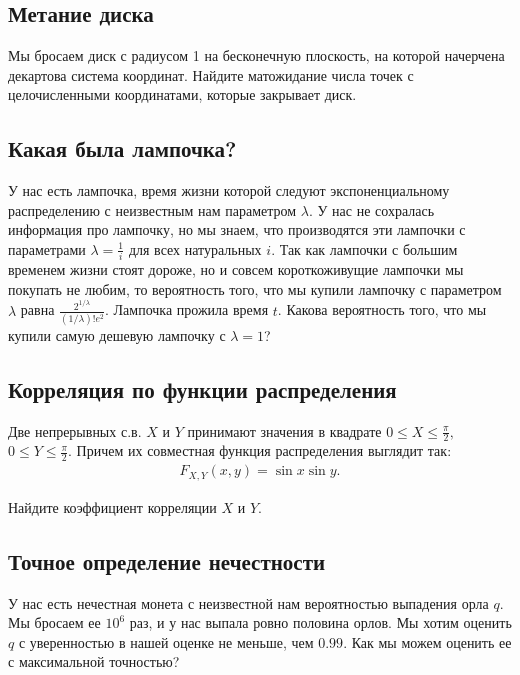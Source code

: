 \documentclass[12pt]{article}
\begin{document}
\subsection{Метание диска}

Мы бросаем диск с радиусом 1 на бесконечную плоскость, на которой начерчена декартова система координат. Найдите матожидание числа точек с целочисленными координатами, которые закрывает диск.



\subsection{Какая была лампочка?}

У нас есть лампочка, время жизни которой следуют экспоненциальному распределению с неизвестным нам параметром $\lambda$. У нас не сохралась информация про лампочку, но мы знаем, что производятся эти лампочки с параметрами $\lambda = \frac{1}{i}$ для всех натуральных $i$. Так как лампочки с большим временем жизни стоят дороже, но и совсем короткоживущие лампочки мы покупать не любим, то вероятность того, что мы купили лампочку с параметром $\lambda$ равна $\frac{2^{1/\lambda}}{(1/\lambda)!e^2}$. Лампочка прожила время $t$. Какова вероятность того, что мы купили самую дешевую лампочку с $\lambda = 1$?




\subsection{Корреляция по функции распределения}

Две непрерывных с.в. $X$ и $Y$ принимают значения в квадрате $0 \le X \le \frac{\pi}{2},$ $0 \le Y \le \frac{\pi}{2}$. Причем их совместная функция распределения выглядит так:
\begin{align*}
    F_{X, Y} (x, y) = \sin x \sin y.
\end{align*}

Найдите коэффициент корреляции $X$ и $Y$.



\subsection{Точное определение нечестности}

У нас есть нечестная монета с неизвестной нам вероятностью выпадения орла $q$. Мы бросаем ее $10^6$ раз, и у нас выпала ровно половина орлов. Мы хотим оценить $q$ с уверенностью в нашей оценке не меньше, чем $0.99$. Как мы можем оценить ее с максимальной точностью? 
\end{document}
